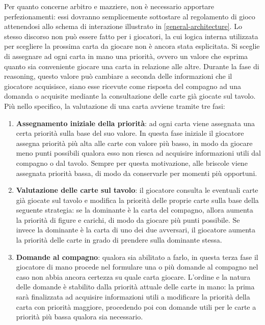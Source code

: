 \documentclass[a4paper,12pt]{article}
\begin{document}
Per quanto concerne arbitro e mazziere, non è necessario apportare perfezionamenti: essi dovranno semplicemente sottostare al regolamento di gioco attenendosi allo schema di interazione illustrato in \autoref{general-architecture}. Lo stesso discorso non può essere fatto per i giocatori, la cui logica interna utilizzata per scegliere la prossima carta da giocare non è ancora stata esplicitata. Si sceglie di assegnare ad ogni carta in mano una priorità, ovvero un valore che esprima quanto sia conveniente giocare una carta in relazione alle altre. Durante la fase di reasoning, questo valore può cambiare a seconda delle informazioni che il giocatore acquisisce, siano esse ricevute come risposta del compagno ad una domanda o acquisite mediante la consultazione delle carte già giocate sul tavolo. Più nello specifico, la valutazione di una carta avviene tramite tre fasi:
\begin{enumerate}
	\item \textbf{Assegnamento iniziale della priorità}: ad ogni carta viene assegnata una certa priorità sulla base del suo valore. In questa fase iniziale il giocatore assegna priorità più alta alle carte con valore più basso, in modo da giocare meno punti possibili qualora esso non riesca ad acquisire informazioni utili dal compagno o dal tavolo. Sempre per questa motivazione, alle briscole viene assegnata priorità bassa, di modo da conservarle per momenti più opportuni.
	\item \textbf{Valutazione delle carte sul tavolo}: il giocatore consulta le eventuali carte già giocate sul tavolo e modifica la priorità delle proprie carte sulla base della seguente strategia: se la dominante è la carta del compagno, allora aumenta la priorità di figure e carichi, di modo da giocare più punti possibile. Se invece la dominante è la carta di uno dei due avversari, il giocatore aumenta la priorità delle carte in grado di prendere sulla dominante stessa.
	\item \textbf{Domande al compagno}: qualora sia abilitato a farlo, in questa terza fase il giocatore di mano procede nel formulare una o più domande al compagno nel caso non abbia ancora certezza su quale carta giocare. L'ordine e la natura delle domande è stabilito dalla priorità attuale delle carte in mano: la prima sarà finalizzata ad acquisire informazioni utili a modificare la priorità della carta con priorità maggiore, procedendo poi con domande utili per le carte a priorità più bassa qualora sia necessario.    
\end{enumerate}
\end{document}
